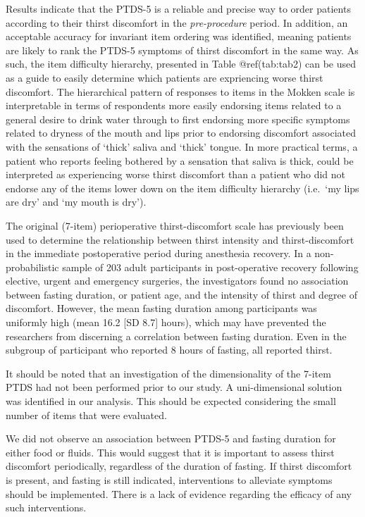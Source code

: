 \documentclass[letterpaper,9pt,twocolumn,twoside,]{pinp}
\begin{document}
Results indicate that the PTDS-5 is a reliable and precise way to order
patients according to their thirst discomfort in the
\emph{pre-procedure} period. In addition, an acceptable accuracy for
invariant item ordering was identified, meaning patients are likely to
rank the PTDS-5 symptoms of thirst discomfort in the same way. As such,
the item difficulty hierarchy, presented in Table @ref(tab:tab2) can be
used as a guide to easily determine which patients are expriencing worse
thirst discomfort. The hierarchical pattern of responses to items in the
Mokken scale is interpretable in terms of respondents more easily
endorsing items related to a general desire to drink water through to
first endorsing more specific symptoms related to dryness of the mouth
and lips prior to endorsing discomfort associated with the sensations of
`thick' saliva and `thick' tongue. In more practical terms, a patient
who reports feeling bothered by a sensation that saliva is thick, could
be interpreted as experiencing worse thirst discomfort than a patient
who did not endorse any of the items lower down on the item difficulty
hierarchy (i.e.~`my lips are dry' and `my mouth is dry').

The original (7-item) perioperative thirst-discomfort scale has
previously been used to determine the relationship between thirst
intensity and thirst-discomfort in the immediate postoperative period
during anesthesia recovery.\citep{Pierotti_2018} In a non-probabilistic
sample of 203 adult participants in post-operative recovery following
elective, urgent and emergency surgeries, the investigators found no
association between fasting duration, or patient age, and the intensity
of thirst and degree of discomfort.\citep{Pierotti_2018} However, the
mean fasting duration among participants was uniformly high (mean 16.2
{[}SD 8.7{]} hours), which may have prevented the researchers from
discerning a correlation between fasting duration. Even in the subgroup
of participant who reported 8 hours of fasting, all reported
thirst.\citep{aroni2012assessment, Pierotti_2018}

It should be noted that an investigation of the dimensionality of the
7-item PTDS had not been performed prior to our study. A uni-dimensional
solution was identified in our analysis. This should be expected
considering the small number of items that were evaluated.

We did not observe an association between PTDS-5 and fasting duration
for either food or fluids. This would suggest that it is important to
assess thirst discomfort periodically, regardless of the duration of
fasting. If thirst discomfort is present, and fasting is still
indicated, interventions to alleviate symptoms should be implemented.
There is a lack of evidence regarding the efficacy of any such
interventions.
\end{document}
